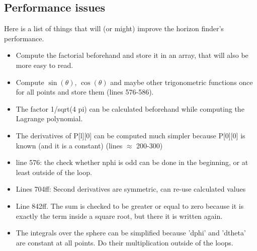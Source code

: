 \documentclass[11pt,a4paper,twoside]{article}
\begin{document}
\subsection{Performance issues}
Here is a list of things that will (or might) improve the
horizon finder's performance.
\begin{itemize}
 \item Compute the factorial beforehand and store it in an array, that will also
       be more easy to read.
 \item Compute $\sin(\theta)$, $\cos(\theta)$ and maybe other trigonometric 
     functions once for all points and  store them (lines 576-586).
 \item The factor 1/sqrt(4 pi) can be calculated beforehand while computing
       the Lagrange polynomial.
 \item The derivatives of P[l][0] can be computed much simpler because
        P[0][0] is known (and it is a constant) (lines $\approx$ 200-300) 
 \item line 576: the check whether nphi is odd can be done in the beginning,
       or at least outside of the loop.
 \item Lines 704ff: Second derivatives are symmetric, can re-use calculated
       values
 \item Line 842ff. The sum is checked to be greater or equal to zero 
       because it is exactly the term
       inside a square root, but there it is written again.
 \item The integrals over the sphere can be simplified because 'dphi' and 
       'dtheta' are constant at all points. Do their multiplication 
       outside of the loops.
\end{itemize} 




\end{document}
